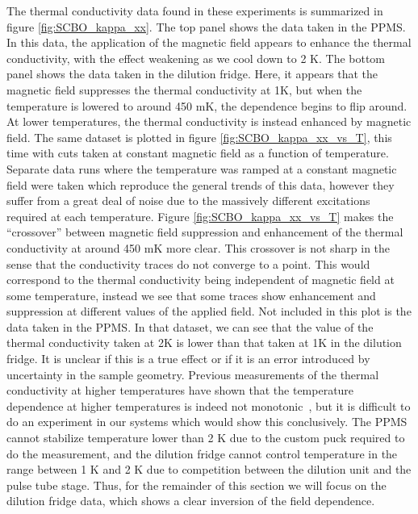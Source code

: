 \documentclass{thesis-umich}
\begin{document}
The thermal conductivity data found in these experiments is summarized in figure \ref{fig:SCBO_kappa_xx}. The top panel shows the data taken in the PPMS. In this data, the application of the magnetic field appears to enhance the thermal conductivity, with the effect weakening as we cool down to 2 K. The bottom panel shows the data taken in the dilution fridge. Here, it appears that the magnetic field suppresses the thermal conductivity at 1K, but when the temperature is lowered to around 450 mK, the dependence begins to flip around. At lower temperatures, the thermal conductivity is instead enhanced by magnetic field. The same dataset is plotted in figure \ref{fig:SCBO_kappa_xx_vs_T}, this time with cuts taken at constant magnetic field as a function of temperature. Separate data runs where the temperature was ramped at a constant magnetic field were taken which reproduce the general trends of this data, however they suffer from a great deal of noise due to the massively different excitations required at each temperature. Figure \ref{fig:SCBO_kappa_xx_vs_T} makes the ``crossover'' between magnetic field suppression and enhancement of the thermal conductivity at around 450 mK more clear. This crossover is not sharp in the sense that the conductivity traces do not converge to a point. This would correspond to the thermal conductivity being independent of magnetic field at some temperature, instead we see that some traces show enhancement and suppression at different values of the applied field. Not included in this plot is the data taken in the PPMS. In that dataset, we can see that the value of the thermal conductivity taken at 2K is lower than that taken at 1K in the dilution fridge. It is unclear if this is a true effect or if it is an error introduced by uncertainty in the sample geometry. Previous measurements of the thermal conductivity at higher temperatures have shown that the temperature dependence at higher temperatures is indeed not monotonic~\cite{Hofmann2001}, but it is difficult to do an experiment in our systems which would show this conclusively. The PPMS cannot stabilize temperature lower than 2 K due to the custom puck required to do the measurement, and the dilution fridge cannot control temperature in the range between 1 K and 2 K due to competition between the dilution unit and the pulse tube stage. Thus, for the remainder of this section we will focus on the dilution fridge data, which shows a clear inversion of the field dependence.
\end{document}

